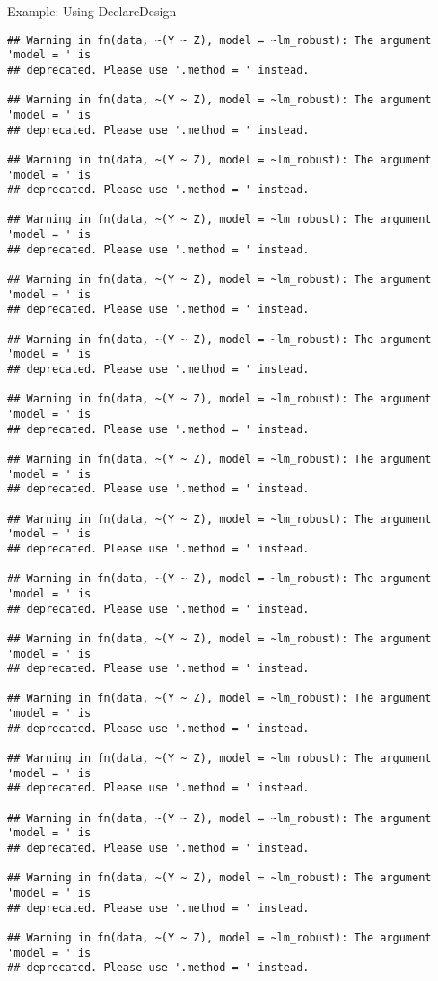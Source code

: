 \documentclass[
  ignorenonframetext,
]{beamer}
\begin{document}
\begin{frame}[fragile]{Example: Using DeclareDesign}
\begin{verbatim}
## Warning in fn(data, ~(Y ~ Z), model = ~lm_robust): The argument 'model = ' is
## deprecated. Please use '.method = ' instead.

## Warning in fn(data, ~(Y ~ Z), model = ~lm_robust): The argument 'model = ' is
## deprecated. Please use '.method = ' instead.

## Warning in fn(data, ~(Y ~ Z), model = ~lm_robust): The argument 'model = ' is
## deprecated. Please use '.method = ' instead.

## Warning in fn(data, ~(Y ~ Z), model = ~lm_robust): The argument 'model = ' is
## deprecated. Please use '.method = ' instead.

## Warning in fn(data, ~(Y ~ Z), model = ~lm_robust): The argument 'model = ' is
## deprecated. Please use '.method = ' instead.

## Warning in fn(data, ~(Y ~ Z), model = ~lm_robust): The argument 'model = ' is
## deprecated. Please use '.method = ' instead.

## Warning in fn(data, ~(Y ~ Z), model = ~lm_robust): The argument 'model = ' is
## deprecated. Please use '.method = ' instead.

## Warning in fn(data, ~(Y ~ Z), model = ~lm_robust): The argument 'model = ' is
## deprecated. Please use '.method = ' instead.

## Warning in fn(data, ~(Y ~ Z), model = ~lm_robust): The argument 'model = ' is
## deprecated. Please use '.method = ' instead.

## Warning in fn(data, ~(Y ~ Z), model = ~lm_robust): The argument 'model = ' is
## deprecated. Please use '.method = ' instead.

## Warning in fn(data, ~(Y ~ Z), model = ~lm_robust): The argument 'model = ' is
## deprecated. Please use '.method = ' instead.

## Warning in fn(data, ~(Y ~ Z), model = ~lm_robust): The argument 'model = ' is
## deprecated. Please use '.method = ' instead.

## Warning in fn(data, ~(Y ~ Z), model = ~lm_robust): The argument 'model = ' is
## deprecated. Please use '.method = ' instead.

## Warning in fn(data, ~(Y ~ Z), model = ~lm_robust): The argument 'model = ' is
## deprecated. Please use '.method = ' instead.

## Warning in fn(data, ~(Y ~ Z), model = ~lm_robust): The argument 'model = ' is
## deprecated. Please use '.method = ' instead.

## Warning in fn(data, ~(Y ~ Z), model = ~lm_robust): The argument 'model = ' is
## deprecated. Please use '.method = ' instead.


\end{verbatim}
\end{frame}
\end{document}
